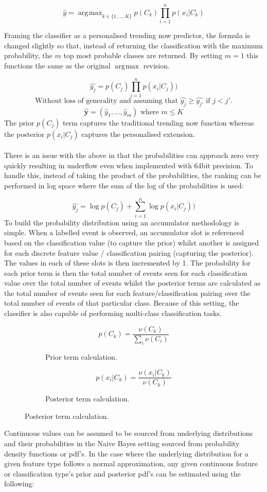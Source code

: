 \documentclass[a4paper,11pt]{scrreprt}
\DeclareMathOperator*{\argmax}{\arg\!\max}
\begin{document}
\[\hat{y}=\argmax_{k \in \{1,...,K\}} p(C_k)\prod_{i=1}^n p(x_i | C_k)\]

Framing the classifier as a personalised trending now predictor, the formula is changed slightly so that, instead of returning the classification with the maximum probability, the \(m\) top most probable classes are returned. By setting \(m=1\) this functions the same as the original \(\argmax\) revision. 

\[\hat{y_j}= p(C_j)\prod_{i=1}^n p(x_i | C_j))\]
\[\text{Without loss of generality and assuming that }  \hat{y_j} \geq \hat{y_{j'}} \text{ if } j < j'.\]
\[\mathbf{\hat{y}} = (\hat{y}_1, ..., \hat{y}_m) \text{ where } m \leq K\]
The prior \(p(C_j)\) term captures the traditional trending now function whereas the posterior \(p(x_i | C_j)\) captures the personalised extension.\\\\ There is an issue with the above in that the probabilities can approach zero very quickly resulting in underflow even when implemented with 64bit precision. To handle this, instead of taking the product of the probabilities, the ranking can be performed in log space where the sum of the log of the probabilities is used:

\[\hat{y_j}= \log p(C_j) + \sum_{i=1}^n \log p(x_i | C_j))\]
To build the probability distribution using an accumulator methodology is simple. When a labelled event is observed, an accumulator slot is referenced based on the classification value (to capture the prior) whilst another is assigned for each discrete feature value / classification pairing (capturing the posterior). The values in each of these slots is then incremented by 1. The probability for each prior term is then the total number of events seen for each classification value over the total number of events whilst the posterior terms are calculated as the total number of events seen for each feature/classification pairing over the total number of events of that particular class. Because of this setting, the classifier is also capable of performing multi-class classification tasks.

\begin{figure}[h!]
\begin{subfigure}[t]{2 in}
\[p(C_k) = \frac{\nu(C_k)}{\sum_{i} \nu(C_i)}\]
\caption{Prior term calculation.}
\end{subfigure}
\begin{subfigure}[t]{2 in}
\[p(x_i | C_k) = \frac{\nu(x_i | C_k)}{\nu(C_k)}\]
\caption{Posterior term calculation.}
\end{subfigure}
\end{figure}
Continuous values can be assumed to be sourced from underlying distributions and their probabilities in the Naive Bayes setting sourced from probability density functions or \acrshort{pdf}'s. In the case where the underlying distribution for a given feature type follows a normal approximation, any given continuous feature or classification type's prior and posterior \acrshort{pdf}'s can be estimated using the following:
\end{document}
